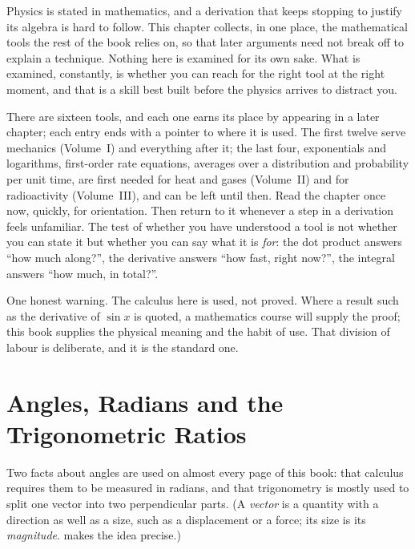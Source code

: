 
Physics is stated in mathematics, and a derivation that keeps stopping to justify its algebra is
hard to follow. This chapter collects, in one place, the mathematical tools the rest of the book
relies on, so that later arguments need not break off to explain a technique. Nothing here is examined
for its own sake. What is examined, constantly, is whether you can reach for the right tool at the
right moment, and that is a skill best built before the physics arrives to distract you.

There are sixteen tools, and each one earns its place by appearing in a later chapter; each entry ends
with a pointer to where it is used. The first twelve serve mechanics (Volume~I) and everything after it;
the last four, exponentials and logarithms, first-order rate equations, averages over a distribution and
probability per unit time, are first needed for heat and gases (Volume~II) and for radioactivity
(Volume~III), and can be left until then. Read the chapter once now, quickly, for orientation. Then return
to it whenever a step in a derivation feels unfamiliar. The test of whether you have understood a
tool is not whether you can state it but whether you can say what it is \emph{for}: the dot product
answers ``how much along?'', the derivative answers ``how fast, right now?'', the integral answers
``how much, in total?''.

One honest warning. The calculus here is used, not proved. Where a result such as the derivative of
$\sin x$ is quoted, a mathematics course will supply the proof; this book supplies the physical
meaning and the habit of use. That division of labour is deliberate, and it is the standard one.

\section{Angles, Radians and the Trigonometric Ratios}

Two facts about angles are used on almost every page of this book: that calculus requires them to be
measured in radians, and that trigonometry is mostly used to split one vector into two perpendicular parts.
(A \emph{vector} is a quantity with a direction as well as a size, such as a displacement or a force;
its size is its \emph{magnitude}.  makes the idea precise.)

